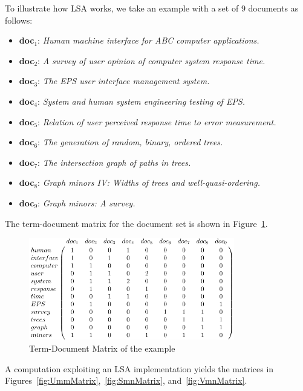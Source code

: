 
To illustrate how LSA works, we take an example with a set of $9$ documents as follows: %

\begin{itemize}
	\item \textbf{doc}$_1$: \emph{Human machine interface for ABC computer applications.}
	\item \textbf{doc}$_2$: \emph{A survey of user opinion of computer system response time.}
	\item \textbf{doc}$_3$: \emph{The EPS user interface management system.}
	\item \textbf{doc}$_4$: \emph{System and human system engineering testing of EPS.}
	\item \textbf{doc}$_5$: \emph{Relation of user perceived response time to error measurement.}
	\item \textbf{doc}$_6$: \emph{The generation of random, binary, ordered trees.}
	\item \textbf{doc}$_7$: \emph{The intersection graph of paths in trees.}
	\item \textbf{doc}$_8$: \emph{Graph minors IV: Widths of trees and well-quasi-ordering.}
	\item \textbf{doc}$_9$: \emph{Graph minors: A survey.}
\end{itemize}

The term-document matrix for the document set is shown in Figure~\ref{fig:TermDocumentMatrix}.

\begin{figure}[h!]
	\centering
	\includegraphics[width=0.8\textwidth]{images/TermDocumentMatrix.pdf}
	\caption{Term-Document Matrix of the example}
	\label{fig:TermDocumentMatrix}
\end{figure}

A computation exploiting an LSA implementation yields the matrices in Figures~\ref{fig:UmmMatrix},~\ref{fig:SmnMatrix}, and~\ref{fig:VmnMatrix}.

